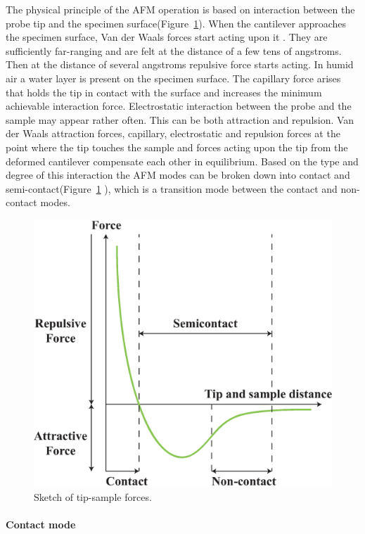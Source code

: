 The physical principle of the AFM operation is based on interaction between the probe tip and the specimen surface(Figure~\ref{fig:afm3}). When the cantilever approaches the specimen surface, Van der Waals forces start acting upon it . They are sufficiently far-ranging and are felt at the distance of a few tens of angstroms. Then at the distance of several angstroms repulsive force starts acting. In humid air a water layer is present on the specimen surface. The capillary force arises that holds the tip in contact with the surface and increases the minimum achievable interaction force. Electrostatic interaction between the probe and the sample may appear rather often. This can be both attraction and repulsion. Van der Waals attraction forces, capillary, electrostatic and repulsion forces at the point where the tip touches the sample and forces acting upon the tip from the deformed cantilever compensate each other in equilibrium. Based on the type and degree of this interaction the AFM modes can be broken down into contact and semi-contact(Figure~\ref{fig:afm3} ), which is a transition mode between the contact and non-contact modes.
\begin{figure}[htb]
\centering
\includegraphics[scale=0.6]{EXP/afm3.eps}
\caption{\label{fig:afm3}Sketch of tip-sample forces.}
\end{figure}

\paragraph{Contact mode}

